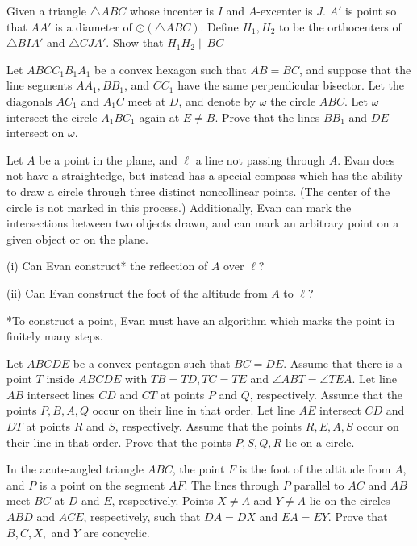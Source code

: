 \documentclass[11pt]{scrartcl}
\begin{document}
\begin{problem}[528504335909385]
Given a triangle $ \triangle{ABC} $ whose incenter is $ I $ and $ A $-excenter is $ J $. $ A' $ is point so that $ AA' $ is a diameter of $ \odot\left(\triangle{ABC}\right) $. Define $ H_{1}, H_{2} $ to be the orthocenters of $ \triangle{BIA'} $ and $ \triangle{CJA'} $. Show that $ H_{1}H_{2} \parallel BC $
\end{problem}
\begin{problem}[876239022447910]
	Let $ABCC_1B_1A_1$ be a convex hexagon such that $AB=BC$, and suppose that the line segments $AA_1, BB_1$, and $CC_1$ have the same perpendicular bisector. Let the diagonals $AC_1$ and $A_1C$ meet at $D$, and denote by $\omega$ the circle $ABC$. Let $\omega$ intersect the circle $A_1BC_1$ again at $E \neq B$. Prove that the lines $BB_1$ and $DE$ intersect on $\omega$.
\end{problem}
\begin{problem}[70043882336455]
Let $A$ be a point in the plane, and $\ell$ a line not passing through $A$. Evan does not have a straightedge, but instead has a special compass which has the ability to draw a circle through three distinct noncollinear points. (The center of the circle is not marked in this process.) Additionally, Evan can mark the intersections between two objects drawn, and can mark an arbitrary point on a given object or on the plane.

(i) Can Evan construct* the reflection of $A$ over $\ell$?

(ii) Can Evan construct the foot of the altitude from $A$ to $\ell$?

*To construct a point, Evan must have an algorithm which marks the point in finitely many steps.
\end{problem}
\begin{problem}[8417327567048605288]
Let $ABCDE$ be a convex pentagon such that $BC=DE$. Assume that there is a point $T$ inside $ABCDE$ with $TB=TD,TC=TE$ and $\angle ABT = \angle TEA$. Let line $AB$ intersect lines $CD$ and $CT$ at points $P$ and $Q$, respectively. Assume that the points $P,B,A,Q$ occur on their line in that order. Let line $AE$ intersect $CD$ and $DT$ at points $R$ and $S$, respectively. Assume that the points $R,E,A,S$ occur on their line in that order. Prove that the points $P,S,Q,R$ lie on a circle.
\end{problem}
\begin{problem}[5873161915777778529]
In the acute-angled triangle $ABC$, the point $F$ is the foot of the altitude from $A$, and $P$ is a point on the segment $AF$. The lines through $P$ parallel to $AC$ and $AB$ meet $BC$ at $D$ and $E$, respectively. Points $X \ne A$ and $Y \ne A$ lie on the circles $ABD$ and $ACE$, respectively, such that $DA = DX$ and $EA = EY$.
Prove that $B, C, X,$ and $Y$ are concyclic.
\end{problem}
\end{document}
